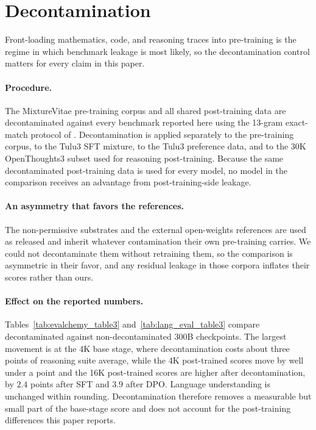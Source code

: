 \section{Decontamination}
\label{app:decontam}

Front-loading mathematics, code, and reasoning traces into pre-training is the regime in which benchmark leakage is most likely, so the decontamination control matters for every claim in this paper.

\paragraph{Procedure.}
The MixtureVitae pre-training corpus and all shared post-training data are decontaminated
against every benchmark reported here using the 13-gram exact-match protocol
of \citet{nguyen2025mixturevitae_arxiv}. Decontamination is applied separately to the
pre-training corpus, to the Tulu3 SFT mixture, to the Tulu3 preference data, and to the
30K OpenThoughts3 subset used for reasoning post-training. Because the same decontaminated
post-training data is used for every model, no model in the comparison receives an
advantage from post-training-side leakage.

\paragraph{An asymmetry that favors the references.}
The non-permissive substrates and the external open-weights references are used as
released and inherit whatever contamination their own pre-training carries. We could not
decontaminate them without retraining them, so the comparison is asymmetric in their
favor, and any residual leakage in those corpora inflates their scores rather than ours.

\paragraph{Effect on the reported numbers.}
Tables~\ref{tab:evalchemy_table3} and~\ref{tab:lang_eval_table3} compare decontaminated
against non-decontaminated 300B checkpoints. The largest movement is at the 4K base stage,
where decontamination costs about three points of reasoning suite average, while the 4K post-trained scores move by well under a point and the 16K post-trained scores are higher after decontamination, by $2.4$ points after SFT and $3.9$ after DPO. Language understanding is unchanged within
rounding. Decontamination therefore removes a measurable but small part of the base-stage
score and does not account for the post-training differences this paper reports.
